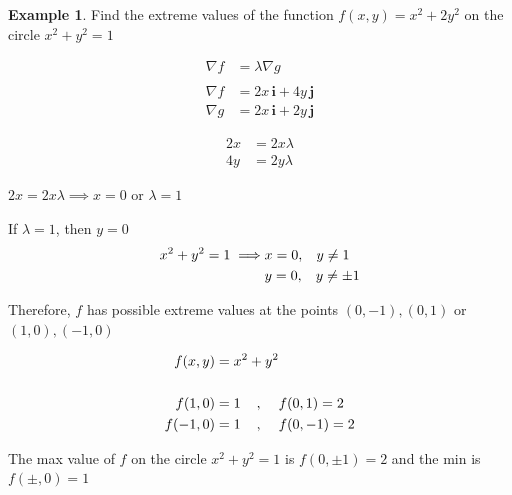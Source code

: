 \documentclass[11pt,a4paper]{article}
\theoremstyle{definition}
\newtheorem{exa}[thm]{Example}
\begin{document}
\begin{exa}


Find the extreme values of the function $f(x,y) = x^2 + 2y^2$ on the circle $x^2 + y^2 = 1$


\begin{align*}
\nabla f & = \lambda \nabla g\\\\
\nabla f & = 2x\,\textbf{i}+ 4y\,\textbf{j}\\
\nabla g & = 2x\,\textbf{i} + 2y\,\textbf{j}
\end{align*}

\begin{align*}
2x & = 2x\lambda\\
4y & = 2y\lambda
\end{align*}

$2x = 2x\lambda \implies x = 0$ or $\lambda = 1$


If $\lambda = 1$, then $y = 0$
\begin{align*}
x^2 + y^2  = 1 \implies & x = 0, \hspace{0.3cm} y \neq 1\\
                        & y = 0 , \hspace{0.3cm} y \neq \pm 1
\end{align*}

Therefore, $f$ has possible extreme values at the points $(0,-1), (0,1)$ or $(1,0), (-1,0)$

\begin{align*}
f(x,y)  & = x^2 + y^2\\\\
f(1,0) & =1 \hspace{0.4cm},\hspace{0.4cm} f(0,1) = 2\\
f(-1,0) & =1 \hspace{0.4cm},\hspace{0.4cm} f(0,-1) = 2
\end{align*}

The max value of $f$ on the circle $x^2 + y^2 = 1$ is $f(0,\pm 1)= 2$ and the min is $f(\pm, 0)=1$



\end{exa}
\end{document}
